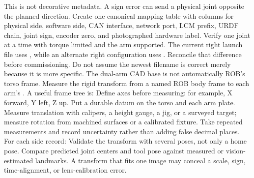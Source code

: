 {}\markdownRendererInterblockSeparator
{}This is not decorative metadata. A sign error can send a physical joint opposite the planned direction. Create one canonical mapping table with columns for physical side, software side, CAN interface, network port, LCM prefix, URDF chain, joint sign, encoder zero, and photographed hardware label. Verify one joint at a time with torque limited and the arm supported.\markdownRendererParagraphSeparator
{}The current right launch file uses , while an alternate right configuration uses . Reconcile that difference before commissioning. Do not assume the newest filename is correct merely because it is more specific.\markdownRendererInterblockSeparator
{}
\markdownRendererSectionEnd 
\markdownRendererSectionEnd \markdownRendererSectionBegin
{}\markdownRendererInterblockSeparator
{}The dual-arm CAD base is not automatically ROB's torso frame. Measure the rigid transform from a named ROB body frame to each arm's . A useful frame tree is:\markdownRendererInterblockSeparator
{}\markdownRendererInterblockSeparator
{}Define axes before measuring: for example, X forward, Y left, Z up. Put a durable datum on the torso and each arm plate. Measure translation with calipers, a height gauge, a jig, or a surveyed target; measure rotation from machined surfaces or a calibrated fixture. Take repeated measurements and record uncertainty rather than adding false decimal places.\markdownRendererInterblockSeparator
{}\markdownRendererSectionBegin
{}\markdownRendererInterblockSeparator
{}For each side record:\markdownRendererInterblockSeparator
{}\markdownRendererInterblockSeparator
{}Validate the transform with several poses, not only a home pose. Compare predicted joint centers and tool pose against measured or vision-estimated landmarks. A transform that fits one image may conceal a scale, sign, time-alignment, or lens-calibration error.\markdownRendererInterblockSeparator
